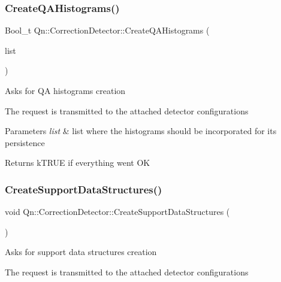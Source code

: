 \subsubsection{\texorpdfstring{Create\+Q\+A\+Histograms()}{CreateQAHistograms()}}
{\footnotesize\ttfamily Bool\+\_\+t Qn\+::\+Correction\+Detector\+::\+Create\+Q\+A\+Histograms (\begin{DoxyParamCaption}\item[{T\+List $\ast$}]{list }\end{DoxyParamCaption})}

Asks for QA histograms creation

The request is transmitted to the attached detector configurations 
\begin{DoxyParams}{Parameters}
{\em list} & list where the histograms should be incorporated for its persistence \\
\hline
\end{DoxyParams}
\begin{DoxyReturn}{Returns}
k\+T\+R\+UE if everything went OK 
\end{DoxyReturn}
\mbox{\label{classQn_1_1CorrectionDetector_a7858076955dbbffabbe3092f9936f51a}} 
\subsubsection{\texorpdfstring{Create\+Support\+Data\+Structures()}{CreateSupportDataStructures()}}
{\footnotesize\ttfamily void Qn\+::\+Correction\+Detector\+::\+Create\+Support\+Data\+Structures (\begin{DoxyParamCaption}{ }\end{DoxyParamCaption})}

Asks for support data structures creation

The request is transmitted to the attached detector configurations \mbox{\label{classQn_1_1CorrectionDetector_a401cd8059027ee1f06eb96de414edc0c}} 
